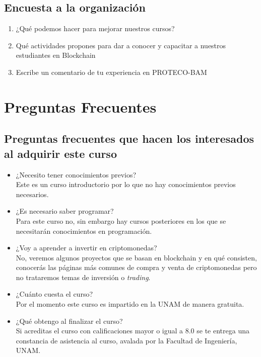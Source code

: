 \documentclass[a4paper,12pt]{lib/pub}
\begin{document}
\subsection{Encuesta a la organización}
\begin{enumerate}
	\item ¿Qué podemos hacer para mejorar nuestros cursos?
	\item Qué actividades propones para dar a conocer y capacitar a nuestros estudiantes en Blockchain
	\item Escribe un comentario de tu experiencia en PROTECO-BAM
\end{enumerate}
\section{Preguntas Frecuentes}
\subsection{Preguntas frecuentes que hacen los interesados al adquirir este curso}
\begin{itemize}
	\item ¿Necesito tener conocimientos previos?\\Este es un curso introductorio por lo que no hay conocimientos previos necesarios.
	\item ¿Es necesario saber programar?\\Para este curso no, sin embargo hay cursos posteriores en los que se necesitarán conocimientos en programación.
	\item ¿Voy a aprender a invertir en criptomonedas?\\No, veremos algunos proyectos que se basan en blockchain y en qué consisten, conocerás las páginas más comunes de compra y venta de criptomonedas pero no trataremos temas de inversión o \textit{trading}.
	\item ¿Cuánto cuesta el curso?\\Por el momento este curso es impartido en la UNAM de manera gratuita.
	\item ¿Qué obtengo al finalizar el curso?\\Si acreditas el curso con calificaciones mayor o igual a 8.0 se te entrega una constancia de asistencia al curso, avalada por la Facultad de Ingeniería, UNAM.
\end{itemize}
\end{document}
